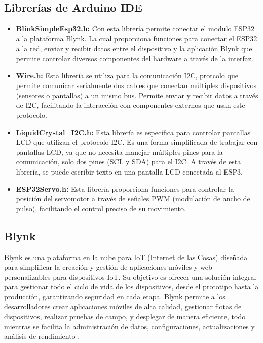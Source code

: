\documentclass[12pt,a4paper]{article}
\begin{document}
\subsection{Librerías de Arduino IDE}
\begin{itemize}
    \item \textbf{BlinkSimpleEsp32.h:} Con esta librería permite conectar el modulo ESP32 a la plataforma Blynk. La cual proporciona funciones para conectar el ESP32 a la red, enviar y recibir datos entre el dispositivo y la aplicación Blynk que permite controlar diversos componentes del hardware a través de la interfaz. 
    \item \textbf{Wire.h:}  Esta librería se utiliza para la comunicación I2C, protcolo que permite comunicar   serialmente dos cables que conectan múltiples dispositivos (sensores o pantallas) a un mismo bus. Permite enviar y recibir datos a través de I2C, facilitando la interacción con componentes externos que usan este protocolo.
    \item \textbf{LiquidCrystal\_I2C.h:} Esta librería es específica para controlar pantallas LCD que utilizan el protocolo I2C. Es una forma simplificada de trabajar con pantallas LCD, ya que no necesita manejar múltiples pines para la comunicación, solo dos pines (SCL y SDA) para el I2C. A través de esta librería, se puede escribir texto en una pantalla LCD conectada al ESP3.
    \item \textbf{ESP32Servo.h:} Esta librería proporciona funciones para controlar la posición del servomotor a través de señales PWM (modulación de ancho de pulso), facilitando el control preciso de su movimiento.
    
\end{itemize}


\subsection{Blynk}
Blynk es una plataforma en la nube para IoT (Internet de las Cosas) diseñada para simplificar la creación y gestión de aplicaciones móviles y web personalizables para dispositivos IoT. Su objetivo es ofrecer una solución integral para gestionar todo el ciclo de vida de los dispositivos, desde el prototipo hasta la producción, garantizando seguridad en cada etapa. Blynk permite a los desarrolladores crear aplicaciones móviles de alta calidad, gestionar flotas de dispositivos, realizar pruebas de campo, y desplegar de manera eficiente, todo mientras se facilita la administración de datos, configuraciones, actualizaciones y análisis de rendimiento \cite{blynk}. 
\end{document}
